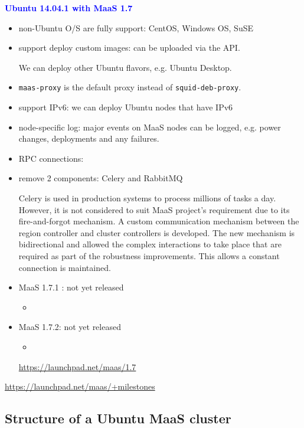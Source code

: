 \textcolor{blue}{\bf Ubuntu 14.04.1 with MaaS 1.7}
\begin{itemize}
  \item non-Ubuntu O/S are fully support: CentOS, Windows OS, SuSE
  
  \item support deploy custom images: can be uploaded via the API. 
  
  We can deploy other Ubuntu flavors, e.g. Ubuntu Desktop.
  
  \item \verb!maas-proxy! is the default proxy instead of
  \verb!squid-deb-proxy!.
  
  \item support IPv6: we can deploy Ubuntu nodes that have IPv6
  
  \item node-specific log: major events on MaaS nodes can be logged, e.g. power
  changes, deployments and any failures.
  
  \item RPC connections:

  \item remove 2 components: Celery and RabbitMQ
  
  Celery is used in production systems to process millions of tasks a day.
  However, it is not considered to suit MaaS project's requirement due to its
  fire-and-forgot mechanism. A custom communication mechanism between the region
  controller and cluster controllers is developed. The new mechanism is
  bidirectional and allowed the complex interactions to take place that are
  required as part of the robustness improvements. This allows a constant
  connection is maintained.
  
  
  
  \item MaaS 1.7.1 : not yet released
  \begin{itemize}
    \item 
  \end{itemize}
  
  \item MaaS 1.7.2: not yet released
  \begin{itemize}
    \item 
  \end{itemize}
  
  \url{https://launchpad.net/maas/1.7}
\end{itemize}
\url{https://launchpad.net/maas/+milestones}

\subsection{Structure of a Ubuntu MaaS cluster}
\label{sec:MaaS_structure}

